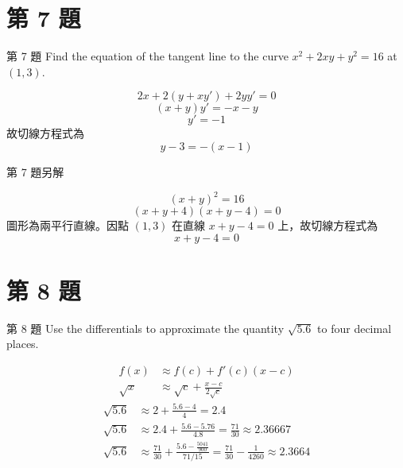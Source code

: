 \documentclass{beamer}
\begin{document}
\begin{CJK}{UTF8}{bsmi}
\section{第 7 題}
\begin{frame}{第 7 題}
  Find the equation of the tangent line to the curve $x^2 + 2xy + y^2 = 16$ at $(1,3)$.
  \begin{solution}
    \[2x + 2 \left( y + xy' \right) + 2yy' = 0\]
    \[\left( x+y \right) y' = -x - y\]
    \[y' = -1\]
    故切線方程式為
    \[y - 3= -(x - 1)\]
  \end{solution}
\end{frame}

\begin{frame}{第 7 題另解}
  \begin{solution}
    \[(x+y)^2 = 16\]
    \[(x+y+4) \left( x+y-4 \right) = 0\]
    圖形為兩平行直線。因點 $(1,3)$ 在直線 $x+y-4=0$ 上，故切線方程式為
    \[x+y-4 = 0\]
  \end{solution}
\end{frame}

\section{第 8 題}
\begin{frame}{第 8 題}
  Use the differentials to approximate the quantity $\sqrt{5.6}$ to four decimal places.
  \begin{solution}
    \begin{align*}
      f(x) &\approx f(c) + f'(c) \left( x-c \right)\\
      \sqrt x &\approx \sqrt c + \frac{x-c}{2 \sqrt c}
    \end{align*}
    \begin{align*}
      \sqrt{5.6} &\approx 2 + \frac{5.6 - 4}{4} = 2.4\\
      \sqrt{5.6} &\approx 2.4 + \frac{5.6 - 5.76}{4.8} = \frac{71}{30} \approx 2.36667\\
      \sqrt{5.6} &\approx \frac{71}{30} + \frac{5.6 - \frac{5041}{900}}{71/15} = \frac{71}{30} - \frac{1}{4260} \approx 2.3664
    \end{align*}
  \end{solution}
\end{frame}


\end{CJK}
\end{document}
